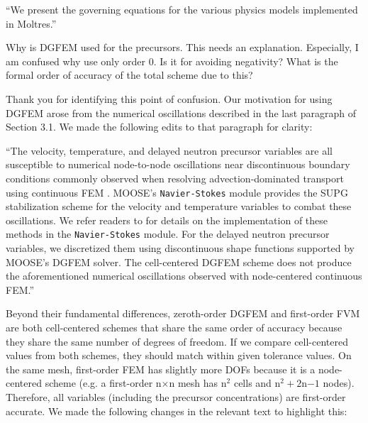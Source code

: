 \documentclass[answers,11pt]{exam}
\begin{document}
\begin{questions}
\begin{solution}
        	``We present the governing equations for the various physics models
        	implemented in Moltres.''
        \end{solution}

        \question Why is DGFEM used for the precursors. This needs an
        explanation. Especially, I am confused why use only order 0. Is it for
        avoiding negativity? What is the formal order of
        accuracy of the total scheme due to this?
        \begin{solution}
        	Thank you for identifying this point of confusion.
        	Our motivation for using DGFEM
        	arose from the numerical oscillations described in the last
        	paragraph of Section 3.1. We made the following edits to that
        	paragraph for clarity:
        	
        	``The velocity, temperature, and delayed neutron precursor variables are all susceptible to numerical node-to-node oscillations near discontinuous boundary conditions commonly observed when resolving advection-dominated transport using continuous FEM \cite{kuhlmann_lid-driven_2018}. MOOSE's \texttt{Navier-Stokes} module provides the SUPG stabilization scheme \cite{brooks_streamline_1982} for the velocity and temperature variables to combat these oscillations. We refer readers to \cite{peterson_overview_2018} for details on the implementation of these methods in the \texttt{Navier-Stokes} module. For the delayed neutron precursor variables, we discretized them using discontinuous shape functions supported by MOOSE's DGFEM solver. The cell-centered DGFEM scheme does not produce the aforementioned numerical oscillations observed with node-centered continuous FEM.''
        	
        	Beyond their fundamental differences, zeroth-order DGFEM and
            first-order FVM are both cell-centered schemes that share the
            same order of accuracy because they share the
            same number of degrees of freedom. If we compare cell-centered
            values from both schemes, they should match within given
            tolerance values. On the same mesh, first-order
            FEM has slightly more DOFs because it is a node-centered scheme
            (e.g. a first-order n$\times$n mesh has n$^2$ cells and
            n$^2+2$n$-1$ nodes).
            Therefore, all variables (including the precursor concentrations)
            are first-order accurate. We made the following changes in the
            relevant text to highlight this:
            

\end{solution}
\end{questions}
\end{document}
